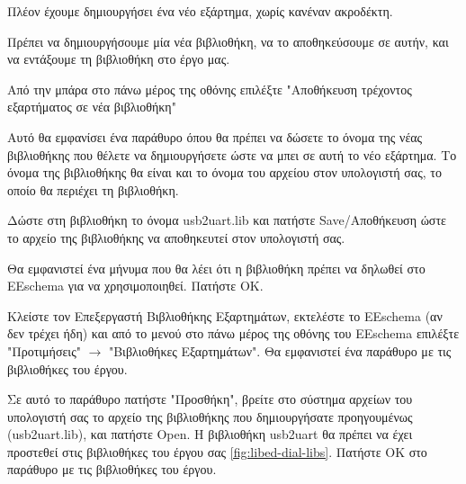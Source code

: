 \documentclass[a4paper]{article}
\begin{document}
Πλέον έχουμε δημιουργήσει ένα νέο εξάρτημα, χωρίς κανέναν ακροδέκτη. 

Πρέπει να δημιουργήσουμε μία νέα βιβλιοθήκη, να το αποθηκεύσουμε σε αυτήν, και να εντάξουμε τη βιβλιοθήκη στο έργο μας.

Από την μπάρα στο πάνω μέρος της οθόνης επιλέξτε "Αποθήκευση τρέχοντος εξαρτήματος σε νέα βιβλιοθήκη" %

Αυτό θα εμφανίσει ένα παράθυρο όπου θα πρέπει να δώσετε το όνομα της νέας βιβλιοθήκης που θέλετε να δημιουργήσετε ώστε να μπει σε αυτή το νέο εξάρτημα. Το όνομα της βιβλιοθήκης θα είναι και το όνομα του αρχείου στον υπολογιστή σας, το οποίο θα περιέχει τη βιβλιοθήκη. 

Δώστε στη βιβλιοθήκη το όνομα \textenglish{usb2uart.lib} και πατήστε Save/Αποθήκευση ώστε το αρχείο της βιβλιοθήκης να αποθηκευτεί στον υπολογιστή σας. 

Θα εμφανιστεί ένα μήνυμα που θα λέει ότι η βιβλιοθήκη πρέπει να δηλωθεί στο \textenglish{EEschema} για να χρησιμοποιηθεί. Πατήστε ΟΚ.

Κλείστε τον Επεξεργαστή Βιβλιοθήκης Εξαρτημάτων, εκτελέστε το \textenglish{EEschema} (αν δεν τρέχει ήδη) και από το μενού στο πάνω μέρος της οθόνης του \textenglish{EEschema} επιλέξτε "Προτιμήσεις" $\rightarrow$ "Βιβλιοθήκες Εξαρτημάτων". Θα εμφανιστεί ένα παράθυρο με τις βιβλιοθήκες του έργου. 

Σε αυτό το παράθυρο πατήστε "Προσθήκη", βρείτε στο σύστημα αρχείων του υπολογιστή σας το αρχείο της βιβλιοθήκης που δημιουργήσατε προηγουμένως (\textenglish{usb2uart.lib}), και πατήστε Open. Η βιβλιοθήκη usb2uart θα πρέπει να έχει προστεθεί στις βιβλιοθήκες του έργου σας \ref{fig:libed-dial-libs}. Πατήστε ΟΚ στο παράθυρο με τις βιβλιοθήκες του έργου.
\end{document}

